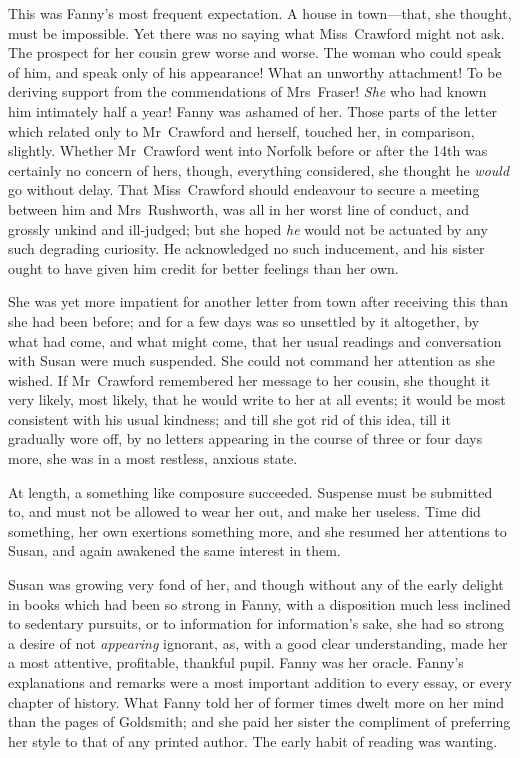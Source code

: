 This was Fanny's most frequent expectation. A house in town—that, she thought, must be impossible. Yet there was no saying what Miss~Crawford might not ask. The prospect for her cousin grew worse and worse. The woman who could speak of him, and speak only of his appearance! What an unworthy attachment! To be deriving support from the commendations of Mrs~Fraser! \textit{She}  who had known him intimately half a year! Fanny was ashamed of her. Those parts of the letter which related only to Mr~Crawford and herself, touched her, in comparison, slightly. Whether Mr~Crawford went into Norfolk before or after the 14th was certainly no concern of hers, though, everything considered, she thought he \textit{would}  go without delay. That Miss~Crawford should endeavour to secure a meeting between him and Mrs~Rushworth, was all in her worst line of conduct, and grossly unkind and ill-judged; but she hoped \textit{he}  would not be actuated by any such degrading curiosity. He acknowledged no such inducement, and his sister ought to have given him credit for better feelings than her own.

She was yet more impatient for another letter from town after receiving this than she had been before; and for a few days was so unsettled by it altogether, by what had come, and what might come, that her usual readings and conversation with Susan were much suspended. She could not command her attention as she wished. If Mr~Crawford remembered her message to her cousin, she thought it very likely, most likely, that he would write to her at all events; it would be most consistent with his usual kindness; and till she got rid of this idea, till it gradually wore off, by no letters appearing in the course of three or four days more, she was in a most restless, anxious state.

At length, a something like composure succeeded. Suspense must be submitted to, and must not be allowed to wear her out, and make her useless. Time did something, her own exertions something more, and she resumed her attentions to Susan, and again awakened the same interest in them.

Susan was growing very fond of her, and though without any of the early delight in books which had been so strong in Fanny, with a disposition much less inclined to sedentary pursuits, or to information for information's sake, she had so strong a desire of not \textit{appearing}  ignorant, as, with a good clear understanding, made her a most attentive, profitable, thankful pupil. Fanny was her oracle. Fanny's explanations and remarks were a most important addition to every essay, or every chapter of history. What Fanny told her of former times dwelt more on her mind than the pages of Goldsmith; and she paid her sister the compliment of preferring her style to that of any printed author. The early habit of reading was wanting.

